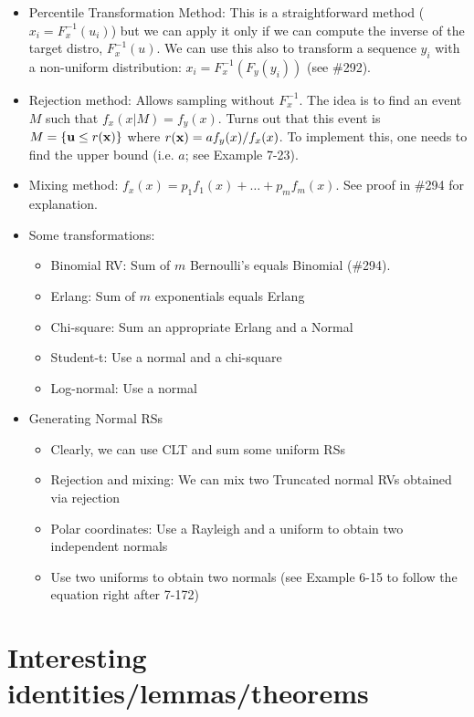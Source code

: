 \documentclass[a4paper]{book}
\begin{document}
\begin{itemize}
\begin{itemize}
	\item Percentile Transformation Method: This is a straightforward method ($x_i=F^{-1}_x(u_i)$) but we can apply it only if we can compute the inverse of the target distro, $F^{-1}_x(u)$. We can use this also to transform a sequence $y_i$ with a non-uniform distribution: $x_i=F_x^{-1}\left(F_y(y_i)\right)$ (see \#292).
	\item Rejection method: Allows sampling without $F^{-1}_x$. The idea is to find an event $M$ such that $f_x(x|M) = f_y(x)$. Turns out that this event is $M=\{\mathbf{u}\leq r(\mathbf{x})\}$ where $r(\mathbf{x}) = a f_y(x)/f_x(x)$. To implement this, one needs to find the upper bound (i.e. $a$; see Example 7-23). 
	\item Mixing method: $f_x(x) = p_1 f_1(x)+\hdots+p_m f_m(x)$. See proof in \#294 for explanation. 
	\item Some transformations:
		\begin{itemize}
		\item Binomial RV: Sum of $m$ \iid Bernoulli's equals Binomial (\#294).
		\item Erlang: Sum of $m$ \iid exponentials equals Erlang
		\item Chi-square: Sum an appropriate Erlang and a Normal
		\item Student-t: Use a normal and a chi-square
		\item Log-normal: Use a normal
		\end{itemize}
	\item Generating Normal RSs
		\begin{itemize}
		\item Clearly, we can use CLT and sum some uniform RSs
		\item Rejection and mixing: We can mix two Truncated normal RVs obtained via rejection
		\item Polar coordinates: Use a Rayleigh and a uniform to obtain two independent normals
		\item Use two uniforms to obtain two normals (see Example 6-15 to follow the equation right after 7-172)
		\end{itemize}
	\end{itemize}
\end{itemize}

\section{Interesting identities/lemmas/theorems}
\end{document}
